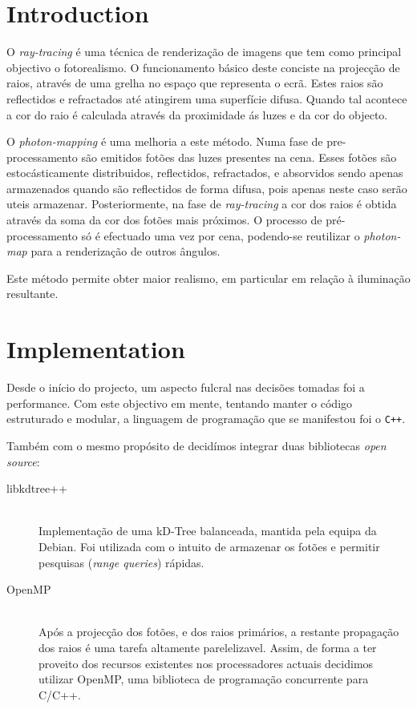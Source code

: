 \documentclass[a4paper]{article}
\title{\documentTitle}
\author{\documentAuthors{}}
\begin{document}
\renewcommand{\figurename}{Figure}
\maketitle
\cleardoublepage

\tableofcontents
\cleardoublepage

\setlength{\parindent}{1cm}
\setlength{\parskip}{0.3cm}

\section{Introduction}
\indent \indent O \emph{ray-tracing} é uma técnica de renderização de imagens que tem como principal objectivo o fotorealismo.
O funcionamento básico deste conciste na projecção de raios, através de uma grelha no espaço que representa o ecrã.
Estes raios são reflectidos e refractados até atingirem uma superfície difusa. Quando tal acontece a cor do raio é
calculada através da proximidade ás luzes e da cor do objecto.

\indent O \emph{photon-mapping} é uma melhoria a este método. Numa fase de pre-processamento são emitidos fotões
das luzes presentes na cena. Esses fotões são estocásticamente distribuidos, reflectidos, refractados, e absorvidos
sendo apenas armazenados quando são reflectidos de forma difusa, pois apenas neste caso serão uteis armazenar.
Posteriormente, na fase de \emph{ray-tracing} a cor dos raios é obtida através da soma da cor dos fotões mais próximos.
O processo de pré-processamento só é efectuado uma vez por cena, podendo-se reutilizar o \emph{photon-map}
para a renderização de outros ângulos. 

\indent Este método permite obter maior realismo, em particular em relação à iluminação resultante. 
 
\cleardoublepage
\section{Implementation}
\indent \indent Desde o início do projecto, um aspecto fulcral nas decisões tomadas foi a performance. Com
este objectivo em mente, tentando manter o código estruturado e modular, a linguagem de programação que se manifestou foi o \texttt{C++}. 

\indent Também com o mesmo propósito de decidímos integrar duas bibliotecas \emph{open source}:

\begin{description}
	\item[libkdtree++] \hfill \\
		Implementação de uma kD-Tree balanceada, mantida pela equipa da Debian. Foi utilizada com o intuito	de armazenar
		os fotões e permitir pesquisas (\emph{range queries}) rápidas.
	\item[OpenMP] \hfill \\
		Após a projecção dos fotões, e dos raios primários, a restante propagação dos raios é uma tarefa altamente parelelizavel.
		Assim, de forma a ter proveito dos recursos existentes nos processadores actuais decidimos utilizar OpenMP, uma biblioteca
		de programação concurrente para C/C++.
\end{description}
\end{document}
